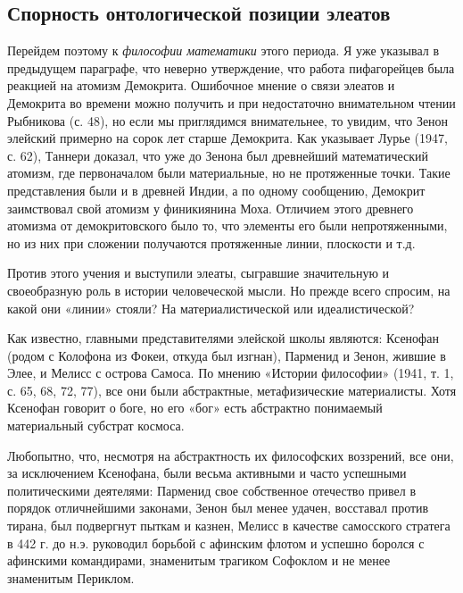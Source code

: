 \subsection{Спорность онтологической позиции элеатов}

Перейдем поэтому к \emph{философии математики} этого периода. Я уже
указывал в предыдущем параграфе, что неверно утверждение, что работа
пифагорейцев была реакцией на атомизм Демокрита. Ошибочное мнение о
связи элеатов и Демокрита во времени можно получить и при недостаточно
внимательном чтении Рыбникова (с. 48), но если мы приглядимся
внимательнее, то увидим, что Зенон элейский примерно на сорок лет
старше Демокрита. Как указывает Лурье (1947, с. 62), Таннери доказал,
что уже до Зенона был древнейший математический атомизм, где
первоначалом были материальные, но не протяженные точки. Такие
представления были и в древней Индии, а по одному сообщению, Демокрит
заимствовал свой атомизм у финикиянина Моха. Отличием этого древнего
атомизма от демокритовского было то, что элементы его были
непротяженными, но из них при сложении получаются протяженные линии,
плоскости и т.д.

Против этого учения и выступили элеаты, сыгравшие значительную и
своеобразную роль в истории человеческой мысли. Но прежде всего
спросим, на какой они «линии» стояли? На материалистической или
идеалистической?

Как известно, главными представителями элейской школы являются:
Ксенофан (родом с Колофона из Фокеи, откуда был изгнан), Парменид и
Зенон, жившие в Элее, и Мелисс с острова Самоса. По мнению «Истории
философии» (1941, т. 1, с. 65, 68, 72, 77), все они были абстрактные,
метафизические материалисты. Хотя Ксенофан говорит о боге, но его
«бог» есть абстрактно понимаемый материальный субстрат космоса.

Любопытно, что, несмотря на абстрактность их философских воззрений,
все они, за исключением Ксенофана, были весьма активными и часто
успешными политическими деятелями: Парменид свое собственное отечество
привел в порядок отличнейшими законами, Зенон был менее удачен,
восставал против тирана, был подвергнут пыткам и казнен, Мелисс в
качестве самосского стратега в 442 г. до н.э. руководил борьбой с
афинским флотом и успешно боролся с афинскими командирами, знаменитым
трагиком Софоклом и не менее знаменитым Периклом.


